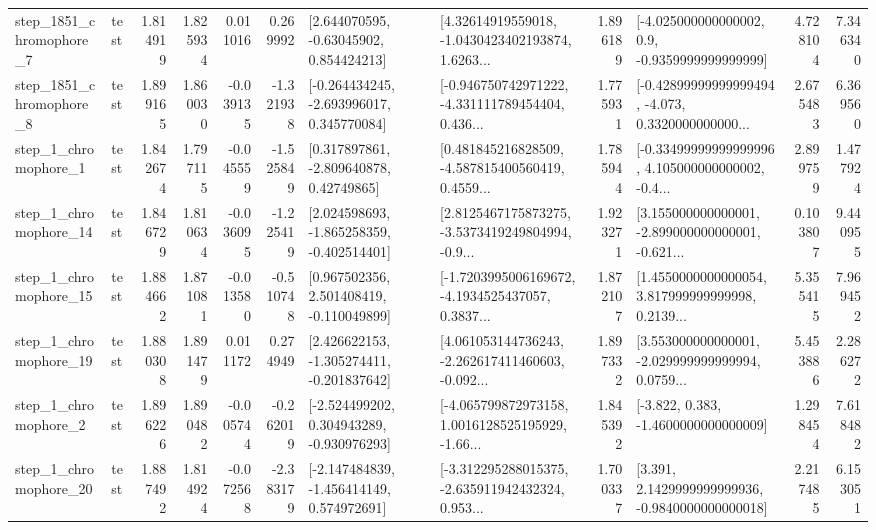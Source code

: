 \begin{tabular}{llrrrrllrlrr}
  step\_1851\_chromophore\_7 &      test &      1.814919 &    1.825934 &      0.011016 &  0.269992 &     [2.644070595, -0.63045902, 0.854424213] &  [4.32614919559018, -1.0430423402193874, 1.6263... &       1.896189 &     [-4.025000000000002, 0.9, -0.9359999999999999] &            4.728104 &          7.346340 \\
  step\_1851\_chromophore\_8 &      test &      1.899165 &    1.860030 &     -0.039135 & -1.321938 &   [-0.264434245, -2.693996017, 0.345770084] &  [-0.946750742971222, -4.331111789454404, 0.436... &       1.775931 &  [-0.42899999999999494, -4.073, 0.3320000000000... &            2.675483 &          6.369560 \\
     step\_1\_chromophore\_1 &      test &      1.842674 &    1.797115 &     -0.045559 & -1.525849 &     [0.317897861, -2.809640878, 0.42749865] &  [0.481845216828509, -4.587815400560419, 0.4559... &       1.785944 &  [-0.33499999999999996, 4.105000000000002, -0.4... &            2.899759 &          1.477924 \\
    step\_1\_chromophore\_14 &      test &      1.846729 &    1.810634 &     -0.036095 & -1.225419 &   [2.024598693, -1.865258359, -0.402514401] &  [2.8125467175873275, -3.5373419249804994, -0.9... &       1.923271 &  [3.155000000000001, -2.899000000000001, -0.621... &            0.103807 &          9.440955 \\
    step\_1\_chromophore\_15 &      test &      1.884662 &    1.871081 &     -0.013580 & -0.510748 &    [0.967502356, 2.501408419, -0.110049899] &  [-1.7203995006169672, -4.1934525437057, 0.3837... &       1.872107 &  [1.4550000000000054, 3.817999999999998, 0.2139... &            5.355415 &          7.969452 \\
    step\_1\_chromophore\_19 &      test &      1.880308 &    1.891479 &      0.011172 &  0.274949 &   [2.426622153, -1.305274411, -0.201837642] &  [4.061053144736243, -2.262617411460603, -0.092... &       1.897332 &  [3.553000000000001, -2.029999999999994, 0.0759... &            5.453886 &          2.286272 \\
     step\_1\_chromophore\_2 &      test &      1.896226 &    1.890482 &     -0.005744 & -0.262019 &   [-2.524499202, 0.304943289, -0.930976293] &  [-4.065799872973158, 1.0016128525195929, -1.66... &       1.845392 &               [-3.822, 0.383, -1.4600000000000009] &            1.298454 &          7.618482 \\
    step\_1\_chromophore\_20 &      test &      1.887492 &    1.814924 &     -0.072568 & -2.383179 &   [-2.147484839, -1.456414149, 0.574972691] &  [-3.312295288015375, -2.635911942432324, 0.953... &       1.700337 &   [3.391, 2.1429999999999936, -0.9840000000000018] &            2.217485 &          6.153051 \\

\end{tabular}
